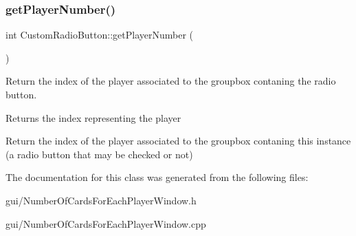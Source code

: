\subsubsection{\texorpdfstring{get\+Player\+Number()}{getPlayerNumber()}}
{\footnotesize\ttfamily int Custom\+Radio\+Button\+::get\+Player\+Number (\begin{DoxyParamCaption}{ }\end{DoxyParamCaption})}



Return the index of the player associated to the groupbox contaning the radio button. 

\begin{DoxyReturn}{Returns}
the index representing the player
\end{DoxyReturn}
Return the index of the player associated to the groupbox contaning this instance (a radio button that may be checked or not) 

The documentation for this class was generated from the following files\+:\begin{DoxyCompactItemize}
\item 
gui/Number\+Of\+Cards\+For\+Each\+Player\+Window.\+h\item 
gui/Number\+Of\+Cards\+For\+Each\+Player\+Window.\+cpp\end{DoxyCompactItemize}
